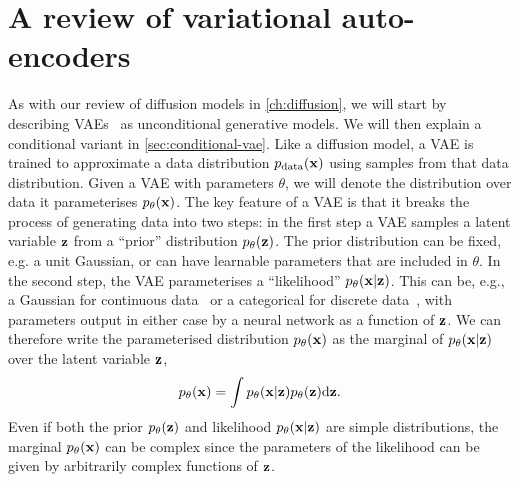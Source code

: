 \section{A review of variational auto-encoders}
\label{sec:vae}
As with our review of diffusion models in \cref{ch:diffusion}, we will start by describing VAEs~\citep{kingma2013auto,rezende2014stochastic} as unconditional generative models. We will then explain a conditional variant in \cref{sec:conditional-vae}. Like a diffusion model, a VAE is trained to approximate a data distribution $p_{\rm{data}}({\mathbf{x}})$ using samples from that data distribution. Given a VAE with parameters $\theta$, we will denote the distribution over data it parameterises $p_\theta({\mathbf{x}})$. The key feature of a VAE is that it breaks the process of generating data into two steps: in the first step a VAE samples a latent variable ${\mathbf{z}}$ from a ``prior'' distribution $p_\theta({\mathbf{z}})$. The prior distribution can be fixed, e.g. a unit Gaussian, or can have learnable parameters that are included in $\theta$. In the second step, the VAE parameterises a ``likelihood'' $p_\theta({\mathbf{x}}|{\mathbf{z}})$. This can be, e.g., a Gaussian for continuous data~\citep{kingma2013auto} or a categorical for discrete data~\citep{child2020very}, with parameters output in either case by a neural network as a function of ${\mathbf{z}}$. We can therefore write the parameterised distribution $p_\theta({\mathbf{x}})$ as the marginal of $p_\theta({\mathbf{x}}|{\mathbf{z}})$ over the latent variable ${\mathbf{z}}$,
\begin{equation} \label{eq:vae-marginal}
p_\theta({\mathbf{x}}) = \int p_\theta({\mathbf{x}}|{\mathbf{z}})p_\theta({\mathbf{z}}) \mathrm{d}{\mathbf{z}}.
\end{equation}
Even if both the prior $p_\theta({\mathbf{z}})$ and likelihood $p_\theta({\mathbf{x}}|{\mathbf{z}})$ are simple distributions, the marginal $p_\theta({\mathbf{x}})$ can be complex since the parameters of the likelihood can be given by arbitrarily complex functions of ${\mathbf{z}}$.

